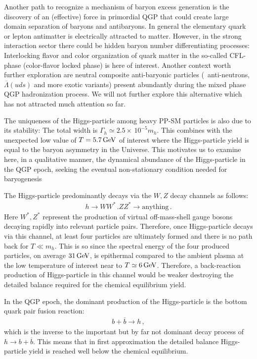 {\color{black}Another path to recognize a mechanism of baryon excess generation is the discovery of an (effective) force in primordial QGP that could create large domain separation of baryons and antibaryons. In general the elementary quark or lepton antimatter is electrically attracted to matter. However, in the strong interaction sector there could be hidden baryon number differentiating processes:  Interlocking flavor and color organization of quark matter in the so-called CFL-phase (color-flavor locked phase) \cite{Rajagopal:2000ff,Alford:2001zr,Kaplan:2001qk} is here of interest. Another context worth further exploration  are neutral composite anti-baryonic particles (\eg\ anti-neutrons, $\overline\Lambda(uds)$ and more exotic variants) present abundantly during the mixed phase QGP hadronization process. We will not further explore this alternative which has not attracted much attention so far. }


The  uniqueness of the Higgs-particle among heavy PP-SM particles is also due to its stability: The total width is $\Gamma_h\simeq 2.5\times\,10^{-5}m_h$. This combines with the unexpected low value of $T=5.7\text{\,GeV}$ of interest where the Higgs-particle yield is equal to the baryon asymmetry in the Universe. This motivates us to examine here, in a qualitative manner, the dynamical abundance of the Higgs-particle in the QGP epoch, seeking the eventual non-stationary condition needed for baryogenesis 

The Higgs-particle predominantly decays via the $W,Z$ decay channels as follows:
\begin{align}
h\longrightarrow WW^\ast\,. ZZ^\ast\longrightarrow\mathrm{anything}\,.
\end{align}
Here $W^\ast,Z^\ast$ represent the production of virtual off-mass-shell gauge bosons decaying rapidly into relevant particle pairs. Therefore, once Higgs-particle decays via this channel, at least four particles are ultimately formed and there is no path back for $T\ll m_h$. This is so since the spectral energy of the four produced particles, on average $31\text{\,GeV}$, is epithermal compared to the ambient plasma at the low temperature of interest near to $T\simeq 6\text{\,GeV}$. Therefore, a back-reaction production of Higgs-particle in this channel would be weaker destroying the detailed balance required for the chemical equilibrium yield. 

In the QGP epoch, the dominant production of the Higgs-particle is the bottom quark pair fusion reaction: 
\begin{align}
b+\overline{b}\longrightarrow h\,,
\end{align}
which is the inverse to the important but by far not dominant decay process of $h\to b+\overline{b}$. This means that in first approximation the detailed balance Higgs-particle yield is reached well below the chemical equilibrium.

